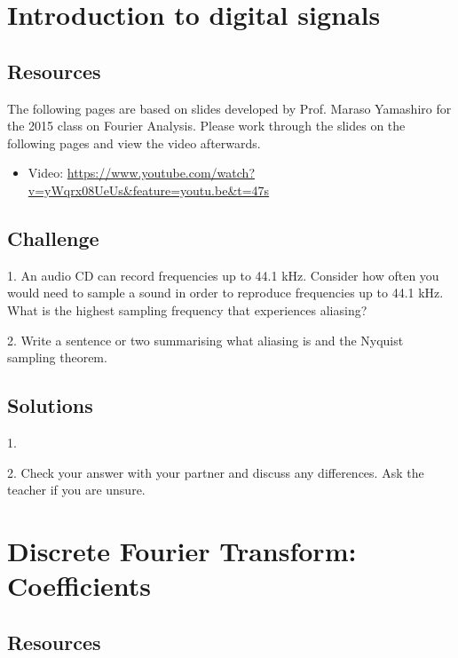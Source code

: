 \section{Introduction to digital signals}

\subsection*{Resources}

The following pages are based on slides developed by Prof. Maraso Yamashiro for the 2015 class on Fourier Analysis. Please work through the slides on the following pages and view the video afterwards.



\begin{itemize}
    \item Video: \url{https://www.youtube.com/watch?v=yWqrx08UeUs&feature=youtu.be&t=47s}
\end{itemize}

\subsection*{Challenge}
1. An audio CD can record frequencies up to 44.1 kHz. Consider how often you would need to sample a sound in order to reproduce frequencies up to 44.1 kHz. What is the highest sampling frequency that experiences aliasing?

2. Write a sentence or two summarising what aliasing is and the Nyquist sampling theorem.

\subsection*{Solutions}
1.\\

2. Check your answer with your partner and discuss any differences. Ask the teacher if you are unsure.





\newpage
\section{Discrete Fourier Transform: Coefficients}

\subsection*{Resources}

